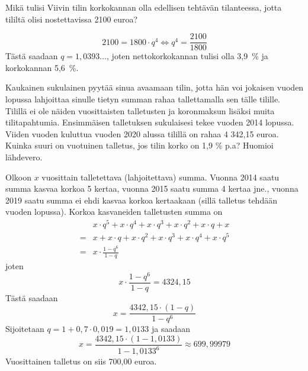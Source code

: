 \documentclass[a4paper,10pt]{article}\usepackage[]{graphicx}\usepackage[]{color}
\begin{document}
\begin{question} Mikä tulisi Viivin tilin korkokannan olla edellisen tehtävän tilanteessa, jotta tililtä olisi nostettavissa 2100 euroa?
\end{question}\begin{solution}
    \[
        2100 = 1800\cdot q^4\Leftrightarrow q^4 = \frac{2100}{1800}
    \]
    Tästä saadaan \(q = 1,0393\dots\), joten nettokorkokannan tulisi olla 3,9~\% ja korkokannan 5,6~\%.
\end{solution}

\begin{question} Kaukainen sukulainen pyytää sinua avaamaan tilin, jotta hän voi jokaisen vuoden lopussa lahjoittaa sinulle tietyn
summan rahaa tallettamalla sen tälle tilille. Tilillä ei ole näiden vuosittaisten talletusten ja koronmaksun lisäksi muita tilitapahtumia.
Ensimmäisen talletuksen sukulaisesi tekee vuoden 2014 lopussa. Viiden vuoden kuluttua vuoden 2020 alussa tilillä on rahaa 4 342{,}15 euroa.
Kuinka suuri on vuotuinen talletus, jos tilin korko on 1{,}9 \% p.a? Huomioi lähdevero.
\end{question}\begin{solution}
Olkoon \(x\) vuosittain talletettava (lahjoitettava) summa. Vuonna 2014 saatu summa kasvaa korkoa 5 kertaa,
vuonna 2015 saatu summa 4 kertaa jne., vuonna 2019 saatu summa ei ehdi kasvaa korkoa kertaakaan
(sillä talletus tehdään vuoden lopussa). Korkoa kasvaneiden talletusten summa on
\begin{align*}
    &x\cdot q^5 + x\cdot q^4+ x\cdot q^3 + x\cdot q^2+ x\cdot q + x \\
    =& x + x\cdot q+ x\cdot q^2 + x\cdot q^3+ x\cdot q^4 + x\cdot q^5\\
    =& x\cdot\frac{1-q^6}{1-q}
\end{align*}
joten
\[
   x\cdot\frac{1-q^6}{1-q} = 4324,15
\]
Tästä saadaan
\[
    x = \frac{4342,15\cdot(1-q)}{1-q^6}
\]
Sijoitetaan \(q= 1 + 0,7\cdot0,019=1,0133\) ja saadaan
\[
x = \frac{4342,15\cdot(1-1,0133)}{1-1,0133^6} \approx 699,99979
\]
Vuosittainen talletus on siis 700,00 euroa.
\end{solution}
\end{document}

